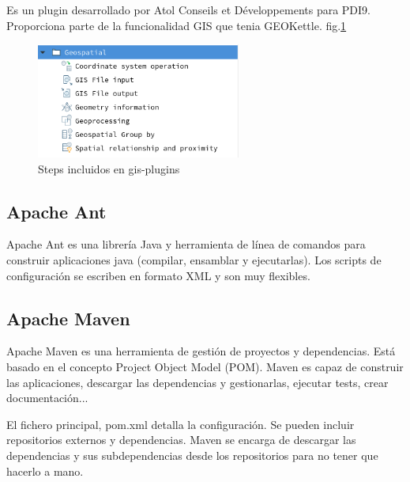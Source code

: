 Es un plugin desarrollado por Atol Conseils et Développements\cite{atol} para PDI9. Proporciona parte de la funcionalidad
GIS que tenia GEOKettle. fig.\ref{fig:gis-plugins} 

\begin{figure}[H]
    \includegraphics[width=0.6\textwidth]{images/gis-plugins.png}
    \centering
    \caption{Steps incluidos en gis-plugins}
    \label{fig:gis-plugins}
\end{figure}


\subsection{Apache Ant}

Apache Ant\cite{apache-ant} es una librería Java y herramienta de línea de comandos para construir aplicaciones java (compilar,
ensamblar y ejecutarlas). Los scripts de configuración se escriben en formato XML y son muy flexibles.

\subsection{Apache Maven}

Apache Maven \cite{apache-maven} es una herramienta de gestión de proyectos y dependencias. Está basado en el
concepto Project Object Model (POM). Maven es capaz de construir las aplicaciones, descargar las dependencias y
gestionarlas, ejecutar tests, crear documentación...

El fichero principal, pom.xml detalla la configuración. Se pueden incluir repositorios externos y dependencias.
Maven se encarga de descargar las dependencias y sus subdependencias desde los repositorios para no tener que
hacerlo a mano.


